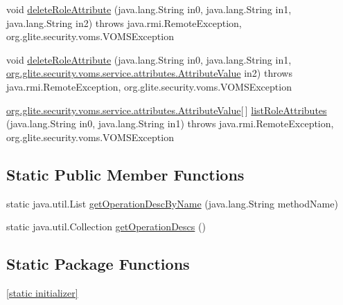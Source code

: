 \begin{DoxyCompactItemize}
\item 
void \hyperlink{classorg_1_1glite_1_1security_1_1voms_1_1service_1_1attributes_1_1VOMSAttributesSoapBindingSkeleton_a28bf7b1838eb05b99712d195f0e23b7b}{deleteRoleAttribute} (java.lang.String in0, java.lang.String in1, java.lang.String in2)  throws java.rmi.RemoteException, org.glite.security.voms.VOMSException     
\item 
void \hyperlink{classorg_1_1glite_1_1security_1_1voms_1_1service_1_1attributes_1_1VOMSAttributesSoapBindingSkeleton_af583d124d9496f5c619ffd2e0681a9b5}{deleteRoleAttribute} (java.lang.String in0, java.lang.String in1, \hyperlink{classorg_1_1glite_1_1security_1_1voms_1_1service_1_1attributes_1_1AttributeValue}{org.glite.security.voms.service.attributes.AttributeValue} in2)  throws java.rmi.RemoteException, org.glite.security.voms.VOMSException     
\item 
\hyperlink{classorg_1_1glite_1_1security_1_1voms_1_1service_1_1attributes_1_1AttributeValue}{org.glite.security.voms.service.attributes.AttributeValue}\mbox{[}$\,$\mbox{]} \hyperlink{classorg_1_1glite_1_1security_1_1voms_1_1service_1_1attributes_1_1VOMSAttributesSoapBindingSkeleton_a6f1023d99ff8c0a9f8466e0c66b02533}{listRoleAttributes} (java.lang.String in0, java.lang.String in1)  throws java.rmi.RemoteException, org.glite.security.voms.VOMSException     
\end{DoxyCompactItemize}
\subsection*{Static Public Member Functions}
\begin{DoxyCompactItemize}
\item 
static java.util.List \hyperlink{classorg_1_1glite_1_1security_1_1voms_1_1service_1_1attributes_1_1VOMSAttributesSoapBindingSkeleton_a95a9bf2668becabebed72ac95519ceb8}{getOperationDescByName} (java.lang.String methodName)
\item 
static java.util.Collection \hyperlink{classorg_1_1glite_1_1security_1_1voms_1_1service_1_1attributes_1_1VOMSAttributesSoapBindingSkeleton_ac9c84ce8f554948d811dfcf3838cbcd1}{getOperationDescs} ()
\end{DoxyCompactItemize}
\subsection*{Static Package Functions}
\begin{DoxyCompactItemize}
\item 
\hyperlink{classorg_1_1glite_1_1security_1_1voms_1_1service_1_1attributes_1_1VOMSAttributesSoapBindingSkeleton_a57f9001f190d557349d4d78b7613d590}{\mbox{[}static initializer\mbox{]}}
\end{DoxyCompactItemize}

